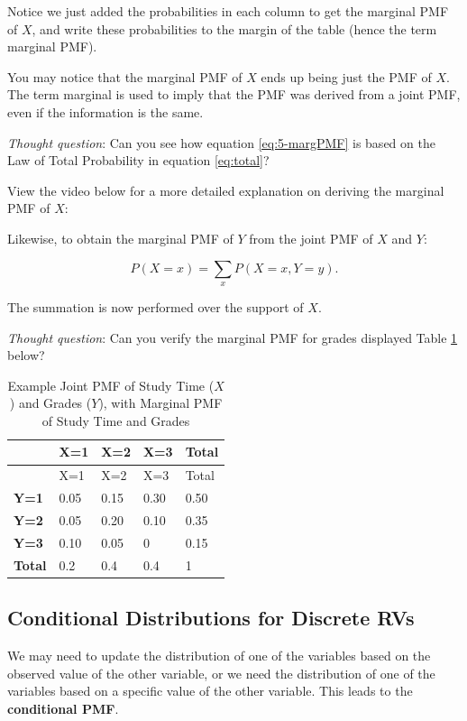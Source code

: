 \documentclass[
]{book}
\begin{document}
Notice we just added the probabilities in each column to get the marginal PMF of \(X\), and write these probabilities to the margin of the table (hence the term marginal PMF).

You may notice that the marginal PMF of \(X\) ends up being just the PMF of \(X\). The term marginal is used to imply that the PMF was derived from a joint PMF, even if the information is the same.

\emph{Thought question}: Can you see how equation \eqref{eq:5-margPMF} is based on the Law of Total Probability in equation \eqref{eq:total}?

View the video below for a more detailed explanation on deriving the marginal PMF of \(X\):

Likewise, to obtain the marginal PMF of \(Y\) from the joint PMF of \(X\) and \(Y\):

\begin{equation} 
P(X=x) = \sum_x P(X=x, Y=y).
\label{eq:5-margPMF2}
\end{equation}

The summation is now performed over the support of \(X\).

\emph{Thought question}: Can you verify the marginal PMF for grades displayed Table \ref{tab:5-marg-table2} below?

\begin{longtable}[]{@{}lllll@{}}
\caption{\label{tab:5-marg-table2} Example Joint PMF of Study Time (\(X\)) and Grades (\(Y\)), with Marginal PMF of Study Time and Grades}\tabularnewline
\toprule\noalign{}
& X=1 & X=2 & X=3 & Total \\
\midrule\noalign{}
\endfirsthead
\toprule\noalign{}
& X=1 & X=2 & X=3 & Total \\
\midrule\noalign{}
\endhead
\bottomrule\noalign{}
\endlastfoot
\textbf{Y=1} & 0.05 & 0.15 & 0.30 & 0.50 \\
\textbf{Y=2} & 0.05 & 0.20 & 0.10 & 0.35 \\
\textbf{Y=3} & 0.10 & 0.05 & 0 & 0.15 \\
\textbf{Total} & 0.2 & 0.4 & 0.4 & 1 \\
\end{longtable}

\hypertarget{conddist}{%
\subsection{Conditional Distributions for Discrete RVs}\label{conddist}}

We may need to update the distribution of one of the variables based on the observed value of the other variable, or we need the distribution of one of the variables based on a specific value of the other variable. This leads to the \textbf{conditional PMF}.
\end{document}
